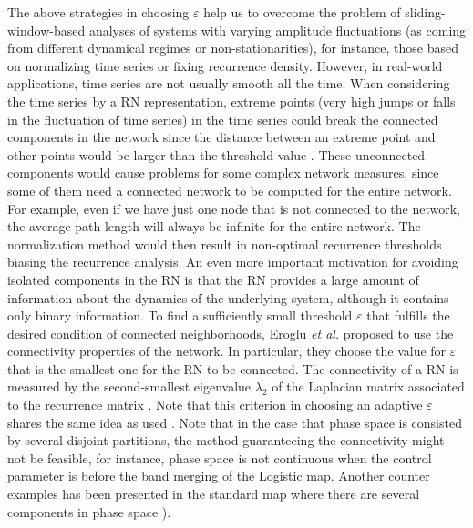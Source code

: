 		The above strategies in choosing $\varepsilon$ help us to overcome the problem of sliding-window-based analyses of systems with varying amplitude fluctuations (as coming from different dynamical regimes or non-stationarities), for instance, those based on normalizing time series or fixing recurrence density. However, in real-world applications, time series are not usually smooth all the time. When considering the time series by a RN representation, extreme points (very high jumps or falls in the fluctuation of time series) in the time series could break the connected components in the network since the distance between an extreme point and other points would be larger than the threshold value \cite{Eroglu2014}. These unconnected components would cause problems for some complex network measures, since some of them need a connected network to be computed for the entire network. For example, even if we have just one node that is not connected to the network, the average path length will always be infinite for the entire network. The normalization method would then result in non-optimal recurrence thresholds biasing the recurrence analysis. An even more important motivation for avoiding isolated components in the RN is that the RN provides a large amount of information about the dynamics of the underlying system, although it contains only binary information. To find a sufficiently small threshold $\varepsilon$ that fulfills the desired condition of connected neighborhoods, Eroglu {\textit{et al.}} proposed to use the connectivity properties of the network. In particular, they choose the value for $\varepsilon$ that is the smallest one for the RN to be connected. The connectivity of a RN is measured by the second-smallest eigenvalue $\lambda_2$ of the Laplacian matrix associated to the recurrence matrix \cite{Eroglu2014}. Note that this criterion in choosing an adaptive $\varepsilon$ shares the same idea as used \cite{Jacob2016b,Lin2016}. Note that in the case that phase space is consisted by several disjoint partitions, the method guaranteeing the connectivity might not be feasible, for instance, phase space is not continuous when the control parameter is before the band merging of the Logistic map. Another counter examples has been presented in the standard map where there are several components in phase space \cite{Donner2010b,Zou2016d}). 
		 
